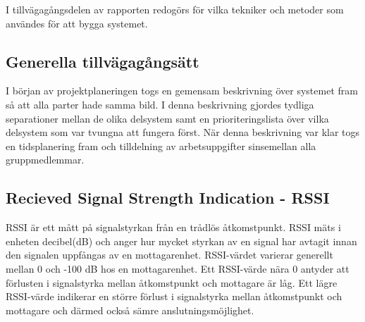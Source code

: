 \documentclass[swedish, a4paper,12pt]{article}
\begin{document}

I tillvägagångsdelen av rapporten redogörs för vilka tekniker och metoder som användes för att bygga systemet.

\subsection{Generella tillvägagångsätt}
I början av projektplaneringen togs en gemensam beskrivning över systemet fram så att alla parter hade samma bild. I denna beskrivning gjordes tydliga separationer mellan de olika delsystem samt en prioriteringslista över vilka delsystem som var tvungna att fungera först. När denna beskrivning var klar togs en tidsplanering fram och tilldelning av arbetsuppgifter sinsemellan alla gruppmedlemmar.

\subsection{Recieved Signal Strength Indication - RSSI}\label{RSSI}
RSSI är ett mått på signalstyrkan från en trådlös åtkomstpunkt. RSSI mäts i enheten decibel(dB) och anger hur mycket styrkan av en signal har avtagit innan den signalen uppfångas av en mottagarenhet. RSSI-värdet varierar generellt mellan 0 och -100 dB hos en mottagarenhet. Ett RSSI-värde nära 0 antyder att förlusten i signalstyrka mellan åtkomstpunkt och mottagare är låg. Ett lägre RSSI-värde indikerar en större förlust i signalstyrka mellan åtkomstpunkt och mottagare och därmed också sämre anslutningsmöjlighet.
\end{document}

